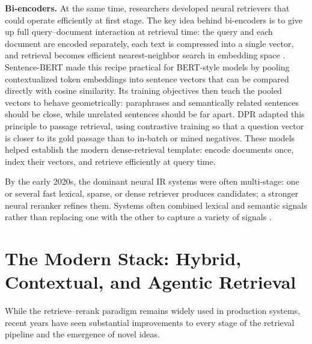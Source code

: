 \noindent\textbf{Bi-encoders.}  At the same time, researchers developed neural retrievers that could operate efficiently at first stage. The key idea behind bi-encoders is to give up full query--document interaction at retrieval time: the query and each document are encoded separately, each text is compressed into a single vector, and retrieval becomes efficient nearest-neighbor search in embedding space . Sentence-BERT  made this recipe practical for BERT-style models by pooling contextualized token embeddings into sentence vectors that can be compared directly with cosine similarity. Its training objectives then teach the pooled vectors to behave geometrically: paraphrases and semantically related sentences should be close, while unrelated sentences should be far apart. DPR  adapted this principle to passage retrieval, using contrastive training so that a question vector is closer to its gold passage than to in-batch or mined negatives. These models helped establish the modern dense-retrieval template: encode documents once, index their vectors, and retrieve efficiently at query time.

By the early 2020s, the dominant neural IR systems were often multi-stage: one or several fast lexical, sparse, or dense retriever produces candidates; a stronger neural reranker refines them. Systems often combined lexical and semantic signals rather than replacing one with the other to capture a variety of signals .

\section{The Modern Stack: Hybrid, Contextual, and Agentic Retrieval}


While the retrieve--rerank paradigm  remains widely used in production systems, recent years have seen substantial improvements to every stage of the retrieval pipeline and the emergence of novel ideas.


